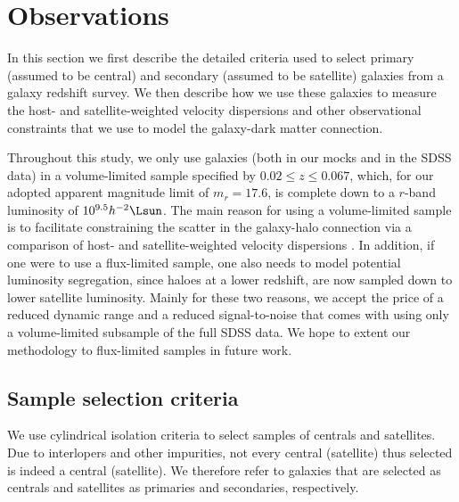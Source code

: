 \documentclass[fleqn,usenatbib,useAMS]{mnras}
\begin{document}
	\section{Observations}
	\label{sec:observations}
	
	In this section we first describe the detailed criteria used to select primary (assumed to be central) and secondary (assumed to be satellite) galaxies from a galaxy redshift survey. We then describe how we use these galaxies to measure the host- and satellite-weighted velocity dispersions and other observational constraints that we use to model the galaxy-dark matter connection. 
	
	Throughout this study, we only use galaxies (both in our mocks and in the SDSS data) in a volume-limited sample specified by $0.02 \leq z \leq 0.067$, which, for our adopted apparent magnitude limit of $m_r = 17.6$, is complete down to a $r$-band luminosity of $10^{9.5} h^{-2}\Lsun$. The main reason for using a volume-limited sample is to facilitate constraining the scatter in the galaxy-halo connection via a comparison of host- and satellite-weighted velocity dispersions \citep[see][for details]{More+09a}. In addition, if one were to use a flux-limited sample, one also needs to model potential luminosity segregation, since haloes at a lower redshift, are now sampled down to lower satellite luminosity. Mainly for these two reasons, we accept the price of a reduced dynamic range and a reduced signal-to-noise that comes with using only a volume-limited subsample of the full SDSS data. We hope to extent our methodology to flux-limited samples in future work.
	
	\subsection{Sample selection criteria}
	\label{subsec:cylinders}
	
	We use cylindrical isolation criteria to select samples of centrals and satellites. Due to interlopers and other impurities, not every central (satellite) thus selected is indeed a central (satellite). We therefore refer to galaxies that are selected as centrals and satellites as primaries and secondaries, respectively.
	
\end{document}

